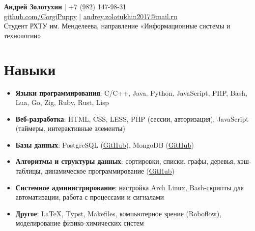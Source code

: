 \documentclass[a4paper,11pt]{article}
\begin{document}
	\begin{center}
		{\Large\bfseries Андрей Золотухин} | +7 (982) 147-98-31 \\
		\vspace{0.2cm}
		\href{https://github.com/CorgiPuppy}{github.com/CorgiPuppy} | \href{mailto:andrey.zolotukhin2017@mail.ru}{andrey.zolotukhin2017@mail.ru} \\
		Студент РХТУ им. Менделеева, направление «Информационные системы и технологии»
	\end{center}

	\section{Навыки}
	\begin{itemize}[leftmargin=*]
		\item \textbf{Языки программирования}: C/C++, Java, Python, JavaScript, PHP, Bash, Lua, Go, Zig, Ruby, Rust, Lisp
		\item \textbf{Веб-разработка}: HTML, CSS, LESS, PHP (сессии, авторизация), JavaScript (таймеры, интерактивные элементы)
		\item \textbf{Базы данных}: PostgreSQL (\href{https://github.com/CorgiPuppy/data-mgmt-labs/tree/master/lab6}{GitHub}), MongoDB (\href{https://github.com/CorgiPuppy/data-mgmt-labs/tree/master/lab8}{GitHub})
		\item \textbf{Алгоритмы и структуры данных}: сортировки, списки, графы, деревья, хэш-таблицы, динамическое программирование (\href{https://github.com/CorgiPuppy/algo-ds-labs}{GitHub})
		\item \textbf{Системное администрирование}: настройка Arch Linux, Bash-скрипты для автоматизации, работа с процессами и сигналами
		\item \textbf{Другое}: LaTeX, Typst, Makefiles, компьютерное зрение (\href{https://roboflow.com/}{Roboflow}), моделирование физико-химических систем
	\end{itemize}

\end{document}
